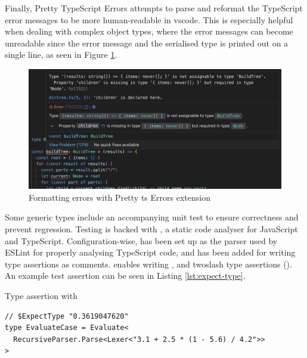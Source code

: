 Finally, Pretty TypeScript Errors \cite{balasianoPrettyTypeScriptErrors2023} attempts to parse and reformat the TypeScript error messages to be more human-readable in \acrshort{vscode}. This is especially helpful when dealing with complex object types, where the error messages can become unreadable since the error message and the serialised type is printed out on a single line, as seen in Figure \ref{fig:pretty-ts-errors}.


\begin{figure}[ht]
  \centering
  \includegraphics[width=\textwidth]{text/testing/pretty-ts-errors.png}
  \caption{Formatting errors with Pretty \acrshort{ts} Errors extension}
  \label{fig:pretty-ts-errors}
\end{figure}

Some generic types include an accompanying unit test to ensure correctness and prevent regression. Testing is backed with \cite{ESLint2023}, a static code analyser for JavaScript and TypeScript. Configuration-wise,  has been set up as the parser used by ESLint for properly analysing TypeScript code, and  has been added for writing type assertions as comments.  enables writing ,  and twoslash type assertions (). An example test assertion can be seen in Listing \ref{lst:expect-type}.

\begin{listing}[ht]
  \caption{Type assertion with }\label{lst:expect-type}
  \begin{verbatim}
// $ExpectType "0.3619047620"
type EvaluateCase = Evaluate<
  RecursiveParser.Parse<Lexer<"3.1 + 2.5 * (1 - 5.6) / 4.2">>
>
\end{verbatim}
\end{listing}

